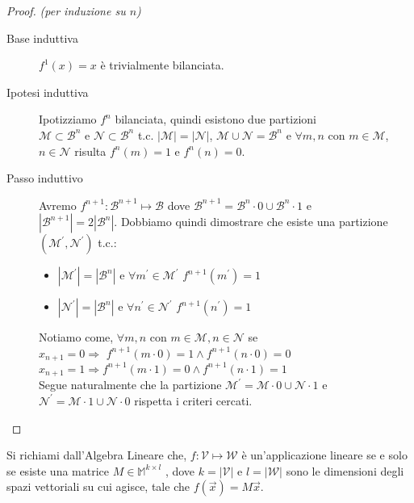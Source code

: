 \documentclass[12pt,a4paper,openright]{report}
\begin{document}
\begin{proof}
    \textit{(per induzione su $n$)\\}
    \begin{description}
        \item[Base induttiva] $f^1(x)=x$ è trivialmente bilanciata.
        \item[Ipotesi induttiva] Ipotizziamo $f^n$ bilanciata, quindi esistono due partizioni \\ $\mathcal{M}\subset\mathcal{B}^n$ e $\mathcal{N}\subset\mathcal{B}^n$ t.c.
                                      ${\left\vert{\mathcal{M}}\right\vert} = {\left\vert{\mathcal{N}}\right\vert}$, $\mathcal{M} \cup \mathcal{N} = \mathcal{B}^n$ e $\forall m,n$ con
                                      $m\in\mathcal{M}$,$n \in\mathcal{N}$ risulta $f^n(m) = 1$ e $ f^n(n) = 0$.
        \item[Passo induttivo] Avremo $f^{n+1}:\mathcal{B}^{n+1}\mapsto\mathcal{B}$ dove  $\mathcal{B}^{n+1} = \mathcal{B}^n\cdot0 \cup \mathcal{B}^n\cdot1$ e\\
                                     $\left\vert\mathcal{B}^{n+1}\right\vert = 2\left\vert\mathcal{B}^{n}\right\vert$. Dobbiamo quindi dimostrare che esiste una partizione
                                     $(\mathcal{M^\prime},\mathcal{N^\prime})$ t.c.:
                                     \begin{itemize}
                                        \item $\left\vert\mathcal{M^\prime}\right\vert=\left\vert\mathcal{B}^{n}\right\vert$ e $\forall m^\prime \in \mathcal{M^\prime}$ $f^{n+1}(m^\prime) = 1$ 
                                        \item $\left\vert\mathcal{N^\prime}\right\vert=\left\vert\mathcal{B}^{n}\right\vert$ e $\forall n^\prime \in \mathcal{N^\prime}$ $f^{n+1}(n^\prime) = 1$   
                                      \end{itemize}
                                      Notiamo come, $\forall m,n$ con $ m\in\mathcal{M},n\in\mathcal{N}$ se\\
                                      $x_{n+1} = 0 \Rightarrow $ $f^{n+1}(m\cdot0)=1 \land f^{n+1}(n\cdot0)=0$\\
                                      $x_{n+1} = 1 \Rightarrow $$f^{n+1}(m\cdot1)=0 \land f^{n+1}(n\cdot1)=1$\\
                                      Segue naturalmente che la partizione $\mathcal{M^\prime} = \mathcal{M}\cdot0 \cup \mathcal{N}\cdot1$ e $\mathcal{N^\prime} = \mathcal{M}\cdot1 \cup \mathcal{N}\cdot0$
                                      rispetta i criteri cercati. 
    \end{description}      
\end{proof}
\par
Si richiami dall'Algebra Lineare che, $f:\mathcal{V}\mapsto\mathcal{W}$ è un'applicazione lineare se e solo se esiste una matrice $M \in \mathbb{M}^{k \times l}$
, dove $k = \left\vert\mathcal{V}\right\vert$ e $l = \left\vert\mathcal{W}\right\vert$ sono le dimensioni degli spazi vettoriali su cui agisce, tale che $f(\vec{x})=M\vec{x}$.\\
\end{document}
